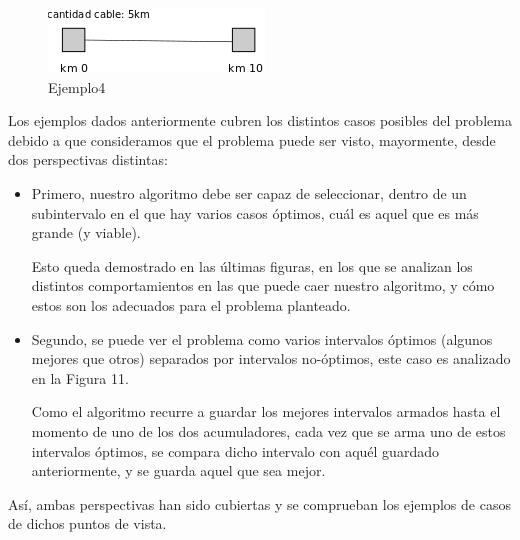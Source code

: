 \documentclass[spanish,a4paper]{article}
\begin{document}
\begin{figure}[h]
\centering
\includegraphics[scale = 0.7]{caso4}
\caption{Ejemplo4}
\label{Ejemplo4}
\end{figure}





Los ejemplos dados anteriormente cubren los distintos casos posibles del problema debido a que consideramos que el problema puede ser visto, mayormente, desde dos perspectivas distintas:

\begin{itemize}

\item Primero, nuestro algoritmo debe ser capaz de seleccionar, dentro de un subintervalo en el que hay varios casos óptimos, cuál es aquel que es más grande (y viable).

Esto queda demostrado en las últimas figuras, en los que se analizan los distintos comportamientos en las que puede caer nuestro algoritmo, y cómo estos son los adecuados para el problema planteado.

\item Segundo, se puede ver el problema como varios intervalos óptimos (algunos mejores que otros) separados por intervalos no-óptimos, este caso es analizado en la Figura 11.

Como el algoritmo recurre a guardar los mejores intervalos armados hasta el momento de uno de los dos acumuladores, cada vez que se arma uno de estos intervalos óptimos, se compara dicho intervalo con aquél guardado anteriormente, y se guarda aquel que sea mejor.

\end{itemize}

Así, ambas perspectivas han sido cubiertas y se comprueban los ejemplos de casos de dichos puntos de vista.


\newpage




\end{document}
